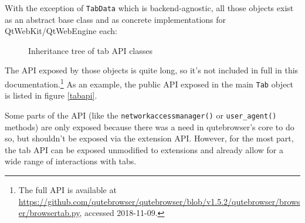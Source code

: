 \documentclass[a4paper,parskip=full]{scrreprt}
\begin{document}
With the exception of \verb|TabData| which is backend-agnostic, all those
objects exist as an abstract base class and as concrete implementations for
QtWebKit/QtWebEngine each:

\begin{figure}[h]
\begin{center}
\end{center}
\caption{Inheritance tree of tab API classes}
\end{figure}

The API exposed by those objects is quite long, so it's not included in full in
this documentation.\footnote{The full API is available at
  \url{https://github.com/qutebrowser/qutebrowser/blob/v1.5.2/qutebrowser/browser/browsertab.py},
accessed 2018-11-09.} As an example, the public API exposed in the main
\verb|Tab| object is listed in figure \ref{tabapi}.

Some parts of the API (like the \verb|networkaccessmanager()| or
\verb|user_agent()| methods) are only exposed because there was a need in
qutebrowser's core to do so, but shouldn't be exposed via the extension API.
However, for the most part, the tab API can be exposed unmodified to extensions
and already allow for a wide range of interactions with tabs.
\end{document}
